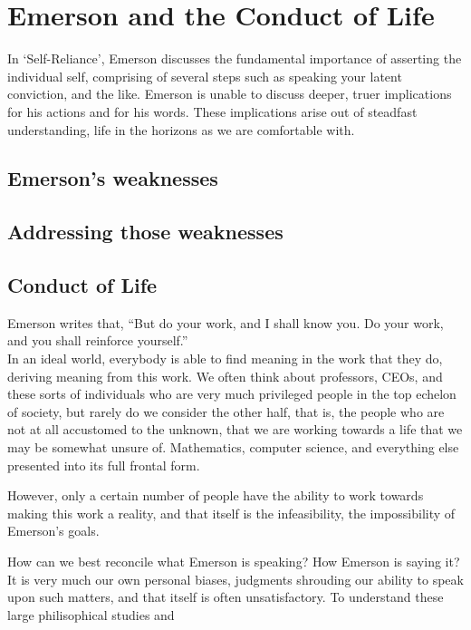 \documentclass[]{article}
\date{}
\begin{document}
\hypertarget{emerson-and-the-conduct-of-life}{%
\section{Emerson and the Conduct of
Life}\label{emerson-and-the-conduct-of-life}}

In `Self-Reliance', Emerson discusses the fundamental importance of
asserting the individual self, comprising of several steps such as
speaking your latent conviction, and the like.  Emerson is unable to discuss deeper, truer implications for his actions and for his words.  These implications arise out of steadfast understanding, life in the horizons as we are comfortable with.

\hypertarget{emersons-weaknesses}{%
\subsection{Emerson's weaknesses}\label{emersons-weaknesses}}

\hypertarget{addressing-those-weaknesses}{%
\subsection{Addressing those
weaknesses}\label{addressing-those-weaknesses}}

\hypertarget{conduct-of-life}{%
\subsection{Conduct of Life}\label{conduct-of-life}}

Emerson writes that, ``But do your work, and I shall know you. Do your
work, and you shall reinforce yourself.''\\
In an ideal world, everybody is able to find meaning in the work that
they do, deriving meaning from this work. We often think about
professors, CEOs, and these sorts of individuals who are very much
privileged people in the top echelon of society, but rarely do we
consider the other half, that is, the people who are not at all
accustomed to the unknown, that we are working towards a life that we may be somewhat unsure of.  Mathematics, computer science, and everything else presented into its full frontal form.

However, only a certain number of people have the ability to work
towards making this work a reality, and that itself is the
infeasibility, the impossibility of Emerson's goals.

How can we best reconcile what Emerson is speaking? How Emerson is
saying it? It is very much our own personal biases, judgments shrouding
our ability to speak upon such matters, and that itself is often
unsatisfactory. To understand these large philisophical studies and
\end{document}
